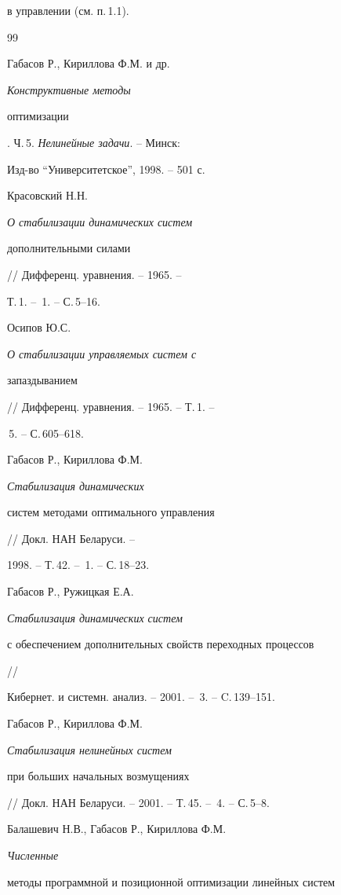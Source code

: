 в управлении (см. п.\,1.1).








\begin{thebibliography}{99}







Габасов Р., Кириллова Ф.М. и др. {\it Конструктивные методы


оптимизации}. Ч.\,5. {\it Нелинейные задачи}. -- Минск:


Изд-во ``Университетское'', 1998. -- 501 с.




Красовский Н.Н. {\it О стабилизации динамических систем


дополнительными силами} // Дифференц. уравнения. -- 1965. --


Т.\,1. -- \No\,1. -- С.\,5--16.




Осипов Ю.С. {\it О стабилизации управляемых систем с


запаздыванием} // Дифференц. уравнения. -- 1965. -- Т.\,1. --


\No\,5. -- С.\,605--618.




Габасов Р., Кириллова Ф.М. {\it Стабилизация динамических


систем методами оптимального управления} // Докл. НАН Беларуси. --


1998. -- Т.\,42. --  \No\,1. -- С.\,18--23.




Габасов Р., Ружицкая Е.А. {\it Стабилизация динамических систем


с обеспечением дополнительных свойств переходных процессов} //


Кибернет. и системн. анализ. -- 2001. -- \No\,3. -- C.\,139--151.




Габасов Р., Кириллова Ф.М. {\it Стабилизация нелинейных систем


при больших начальных возмущениях}


// Докл. НАН Беларуси. -- 2001. -- Т.\,45. -- \No\,4. -- С.\,5--8.




Балашевич Н.В., Габасов Р., Кириллова Ф.М. {\it Численные


методы программной и позиционной оптимизации линейных систем


}
\end{thebibliography}
